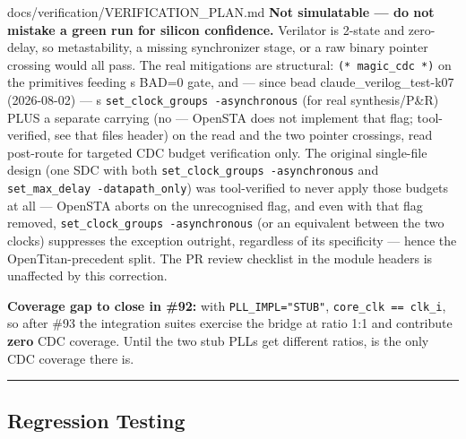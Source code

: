 \begin{relocated}{docs/verification/VERIFICATION_PLAN.md}
\textbf{Not simulatable --- do not mistake a green run for silicon
confidence.} Verilator is 2-state and zero-delay, so metastability, a
missing synchronizer stage, or a raw binary pointer crossing would all
pass. The real mitigations are structural:
\texttt{(*\ magic\_\allowbreak{}cdc\ *)} on the primitives feeding \textquotesingle s  BAD=0 gate, and --- since bead
claude\_\allowbreak{}verilog\_\allowbreak{}test-k07 (2026-08-02) ---
\textquotesingle s
\texttt{set\_\allowbreak{}clock\_\allowbreak{}groups\ -\allowbreak{}asynchronous}
(for real synthesis/\allowbreak{}P\&R) PLUS a separate
 carrying
 (no  --- OpenSTA does not
implement that flag; tool-verified, see that file\textquotesingle s
header) on the  read and the two pointer crossings, read
post-route for targeted CDC budget verification only. The original
single-file design (one SDC with both
\texttt{set\_\allowbreak{}clock\_\allowbreak{}groups\ -\allowbreak{}asynchronous}
and
\texttt{set\_\allowbreak{}max\_\allowbreak{}delay\ -\allowbreak{}datapath\_\allowbreak{}only})
was tool-verified to never apply those budgets at all --- OpenSTA aborts
 on the unrecognised  flag, and even
with that flag removed,
\texttt{set\_\allowbreak{}clock\_\allowbreak{}groups\ -\allowbreak{}asynchronous}
(or an equivalent  between the two clocks)
suppresses the  exception outright, regardless of
its  specificity --- hence the OpenTitan-precedent split.
The PR review checklist in the module headers is unaffected by this
correction.

\textbf{Coverage gap to close in \#92:} with
\texttt{PLL\_\allowbreak{}IMPL=\allowbreak{}"STUB"},
\texttt{core\_\allowbreak{}clk\ =\allowbreak{}=\allowbreak{}\ clk\_\allowbreak{}i},
so after \#93 the  integration suites exercise the bridge
at ratio 1:1 and contribute \textbf{zero} CDC coverage. Until the two
stub PLLs get different ratios,  is the only
CDC coverage there is.

\begin{center}\rule{0.5\linewidth}{0.5pt}\end{center}

\subsection{Regression Testing}\label{ds:ch:verification-plan:regression-testing}


\end{relocated}
